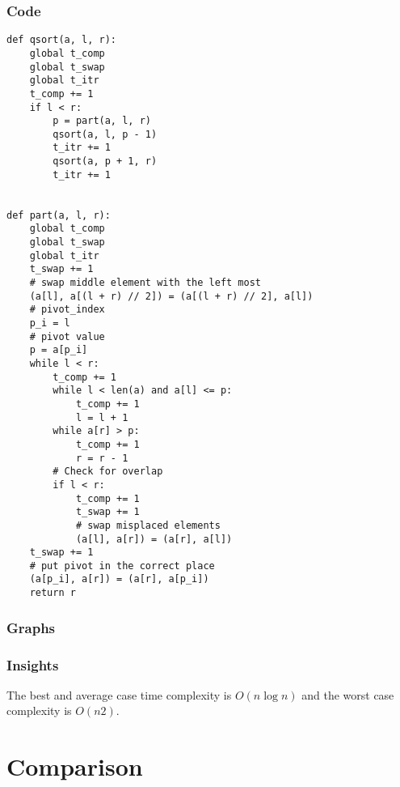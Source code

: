 \documentclass[12pt]{article}
\begin{document}
\subsubsection*{Code}
\begin{verbatim}
def qsort(a, l, r):
    global t_comp
    global t_swap
    global t_itr
    t_comp += 1
    if l < r:
        p = part(a, l, r)
        qsort(a, l, p - 1)
        t_itr += 1
        qsort(a, p + 1, r)
        t_itr += 1


def part(a, l, r):
    global t_comp
    global t_swap
    global t_itr
    t_swap += 1
    # swap middle element with the left most
    (a[l], a[(l + r) // 2]) = (a[(l + r) // 2], a[l])
    # pivot_index
    p_i = l
    # pivot value
    p = a[p_i]
    while l < r:
        t_comp += 1
        while l < len(a) and a[l] <= p:
            t_comp += 1
            l = l + 1
        while a[r] > p:
            t_comp += 1
            r = r - 1
        # Check for overlap
        if l < r:
            t_comp += 1
            t_swap += 1
            # swap misplaced elements
            (a[l], a[r]) = (a[r], a[l])
    t_swap += 1
    # put pivot in the correct place
    (a[p_i], a[r]) = (a[r], a[p_i])
    return r
\end{verbatim}
\subsubsection*{Graphs}





\subsubsection*{Insights}
The best and average case time complexity is $O(n \log n)$ and the worst case
complexity is $O(n2)$.
\section{Comparison}





\end{document}
